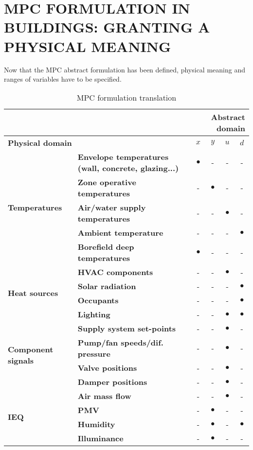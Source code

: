\documentclass[10pt]{extarticle}
\begin{document}
\section{MPC FORMULATION IN BUILDINGS: GRANTING A PHYSICAL MEANING }

Now that the MPC abstract formulation has been defined, 
physical meaning and ranges of variables have to be specified.

\begin{table}[b]
\centering
\caption{MPC formulation translation}
\begin{tabular}{l|l|cccc}
\toprule
\multicolumn{2}{r}{}  & \multicolumn{4}{r}{\textbf{Abstract domain}} \\
\toprule
\multicolumn{2}{l}{\textbf{Physical domain}} & \textbf{$x$} & \textbf{$y$} & \textbf{$u$} & \textbf{$d$} \\ 
\midrule
\multirow{5}{*}{\textbf{Temperatures}} & \textbf{Envelope temperatures (wall, concrete, glazing...)} & $\bullet$ & - & - & - \\ 
& \textbf{Zone operative temperatures} & - & $\bullet$ & - & - \\
& \textbf{Air/water supply temperatures} & - & - & $\bullet$ & - \\
& \textbf{Ambient temperature} & - & - & - & $\bullet$ \\
& \textbf{Borefield deep temperatures} & $\bullet$ & - & - & - \\
\midrule
\multirow{4}{*}{\textbf{Heat sources}} &
\textbf{HVAC components} & - & - & $\bullet$ & - \\
& \textbf{Solar radiation} & - & - & - & $\bullet$ \\
& \textbf{Occupants} & - & - & - & $\bullet$ \\
& \textbf{Lighting} & - & - & $\bullet$ & $\bullet$ \\
\midrule
\multirow{4}{*}{\textbf{Component signals}} &
\textbf{Supply system set-points} & - & - & $\bullet$ & - \\
& \textbf{Pump/fan speeds/dif. pressure} & - & - & $\bullet$ & - \\
& \textbf{Valve positions} & - & - & $\bullet$ & - \\
& \textbf{Damper positions} & - & - & $\bullet$ & - \\
\midrule
\multirow{4}{*}{\textbf{IEQ}} &
 \textbf{Air mass flow} & - & - & $\bullet$ & - \\
& \textbf{PMV} & - & $\bullet$ & - & - \\
& \textbf{Humidity} & - & $\bullet$ & - & $\bullet$ \\
& \textbf{Illuminance} & - & $\bullet$ & - & - \\
\bottomrule 
\end{tabular}
\end{table} 
\end{document}
